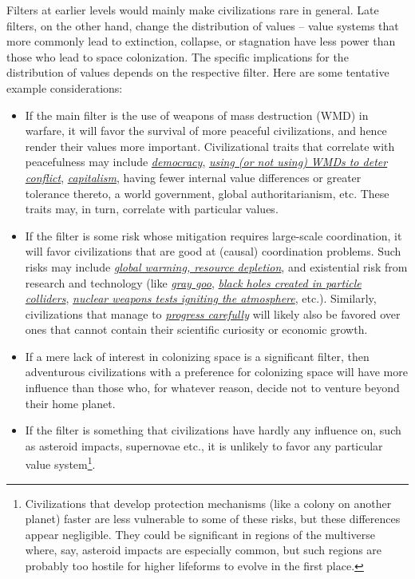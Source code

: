 \documentclass[]{article}
\begin{document}
Filters at earlier levels would mainly make civilizations rare in
general. Late filters, on the other hand, change the distribution of
values -- value systems that more commonly lead to extinction, collapse,
or stagnation have less power than those who lead to space colonization.
The specific implications for the distribution of values depends on the
respective filter. Here are some tentative example considerations:

\begin{itemize}
\item
  If the main filter is the use of weapons of mass destruction (WMD) in
  warfare, it will favor the survival of more peaceful civilizations,
  and hence render their values more important. Civilizational traits
  that correlate with peacefulness may include
  \href{https://en.wikipedia.org/wiki/Democratic_peace_theory}{\emph{democracy}},
  \href{https://en.wikipedia.org/wiki/Nuclear_peace}{\emph{using (or not
  using) WMDs to deter conflict}},
  \href{https://en.wikipedia.org/wiki/Capitalist_peace}{\emph{capitalism}},
  having fewer internal value differences or greater tolerance thereto,
  a world government, global authoritarianism, etc. These traits may, in
  turn, correlate with particular values.
\item
  If the filter is some risk whose mitigation requires large-scale
  coordination, it will favor civilizations that are good at (causal)
  coordination problems. Such risks may include
  \href{https://en.wikipedia.org/wiki/Fermi_paradox\#Resource_depletion_and_climate_change}{\emph{global
  warming, resource depletion}}, and existential risk from research and
  technology (like
  \href{https://en.wikipedia.org/wiki/Grey_goo}{\emph{gray goo}},
  \href{https://en.wikipedia.org/wiki/Safety_of_high-energy_particle_collision_experiments}{\emph{black
  holes created in particle colliders}},
  \href{https://fas.org/sgp/othergov/doe/lanl/docs1/00329010.pdf}{\emph{nuclear
  weapons tests igniting the atmosphere}}, etc.). Similarly,
  civilizations that manage to
  \href{https://foundational-research.org/differential-intellectual-progress-as-a-positive-sum-project/}{\emph{progress
  carefully}} will likely also be favored over ones that cannot contain
  their scientific curiosity or economic growth.
\item
  If a mere lack of interest in colonizing space is a significant
  filter, then adventurous civilizations with a preference for
  colonizing space will have more influence than those who, for whatever
  reason, decide not to venture beyond their home planet.
\item
  If the filter is something that civilizations have hardly any
  influence on, such as asteroid impacts, supernovae etc., it is
  unlikely to favor any particular value system\footnote{Civilizations
    that develop protection mechanisms (like a colony on another planet)
    faster are less vulnerable to some of these risks, but these
    differences appear negligible. They could be significant in regions
    of the multiverse where, say, asteroid impacts are especially
    common, but such regions are probably too hostile for higher
    lifeforms to evolve in the first place.}.
\end{itemize}
\end{document}
